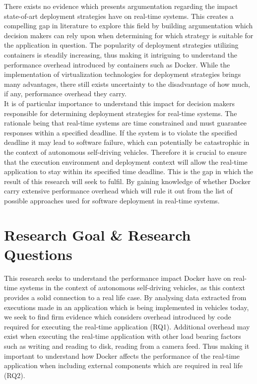 There exists no evidence which presents argumentation regarding the impact state-of-art deployment strategies have on real-time systems. This creates a compelling gap in literature to explore this field by building argumentation which decision makers can rely upon when determining for which strategy is suitable for the application in question. The popularity of deployment strategies utilizing containers is steadily increasing, thus making it intriguing to understand the performance overhead introduced by containers such as Docker. While the implementation of virtualization technologies for deployment strategies brings many advantages, there still exists uncertainty to the disadvantage of how much, if any, performance overhead they carry.\\

It is of particular importance to understand this impact for decision makers responsible for determining deployment strategies for real-time systems. The rationale being that real-time systems are time constrained and must guarantee responses within a specified deadline. If the system is to violate the specified deadline it may lead to software failure, which can potentially be catastrophic in the context of autonomous self-driving vehicles. Therefore it is crucial to ensure that the execution environment and deployment context will allow the real-time application to stay within its specified time deadline. This is the gap in which the result of this research will seek to fulfil. By gaining knowledge of whether Docker carry extensive performance overhead which will rule it out from the list of possible approaches used for software deployment in real-time systems.\\

\section{Research Goal \& Research Questions}
This research seeks to understand the performance impact Docker have on real-time systems in the context of autonomous self-driving vehicles, as this context provides a solid connection to a real life case. By analysing data extracted from executions made in an application which is being implemented in vehicles today, we seek to find firm evidence which considers overhead introduced by code required for executing the real-time application (RQ1). Additional overhead may exist when executing the real-time application with other load bearing factors such as writing and reading to disk, reading from a camera feed. Thus making it important to understand how Docker affects the performance of the real-time application when including external components which are required in real life (RQ2).\\

